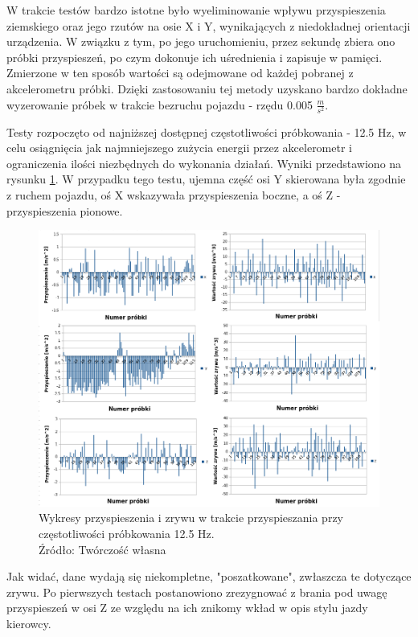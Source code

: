 W trakcie testów bardzo istotne było wyeliminowanie wpływu przyspieszenia ziemskiego oraz jego rzutów na osie X i Y, wynikających z niedokładnej orientacji urządzenia. W związku z tym, po jego uruchomieniu, przez sekundę zbiera ono próbki przyspieszeń, po czym dokonuje ich uśrednienia i zapisuje w pamięci. Zmierzone w ten sposób wartości są odejmowane od każdej pobranej z akcelerometru próbki. Dzięki zastosowaniu tej metody uzyskano bardzo dokładne wyzerowanie próbek w trakcie bezruchu pojazdu - rzędu 0.005 $\frac{m}{s^2}$.

Testy rozpoczęto od najniższej dostępnej częstotliwości próbkowania - 12.5 Hz, w celu osiągnięcia jak najmniejszego zużycia energii przez akcelerometr i ograniczenia ilości niezbędnych do wykonania działań. Wyniki przedstawiono na rysunku \ref{fig:image_driving_analysis_test_12Hz}. W przypadku tego testu, ujemna część osi Y skierowana była zgodnie z ruchem pojazdu, oś X wskazywała przyspieszenia boczne, a oś Z - przyspieszenia pionowe.

\begin{figure}[H]
	\centering
	\includegraphics[width=16cm]{img/driving_analysis/12_5Hz_Przyspieszanie.png}
	\caption{Wykresy przyspieszenia i zrywu w trakcie przyspieszania przy częstotliwości próbkowania 12.5 Hz.
	\\Źródło: Twórczość własna}
	\label{fig:image_driving_analysis_test_12Hz}
\end{figure}

Jak widać, dane wydają się niekompletne, "poszatkowane", zwłaszcza te dotyczące zrywu. Po pierwszych testach postanowiono zrezygnować z brania pod uwagę przyspieszeń w osi Z ze względu na ich znikomy wkład w opis stylu jazdy kierowcy.

